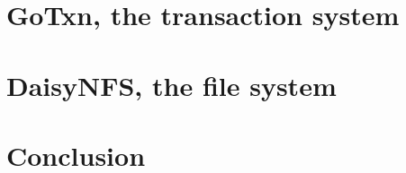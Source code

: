\documentclass[11pt,twoside,final]{mitthesis}
\begin{document}
\chapter{GoTxn, the transaction system}%
\label{sec:txn}


\chapter{DaisyNFS, the file system}%
\label{sec:daisy-nfs}


\chapter{Conclusion}%
\label{sec:conclusion}



\begin{spacing}{1}
{}

\end{spacing}
\end{document}
